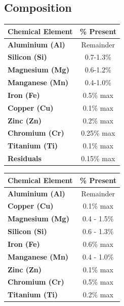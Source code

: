 \documentclass{article}
\begin{document}
\subsection{Composition}
\centering
\begin{minipage}{0.4\textwidth}
    \centering
    \renewcommand{\arraystretch}{1.4}
    \begin{tabular}{|>{\normalsize\bfseries}l|>{\normalsize}c|}
        \hline
        \large\textbf{Chemical Element} & \large\textbf{\% Present} \\ \hline
        Aluminium (Al)            & Remainder           \\ \hline
        Silicon (Si)              & 0.7-1.3\%           \\ \hline
        Magnesium (Mg)            & 0.6-1.2\%           \\ \hline
        Manganese (Mn)            & 0.4-1.0\%           \\ \hline
        Iron (Fe)                 & 0.5\% max           \\ \hline
        Copper (Cu)               & 0.1\% max           \\ \hline
        Zinc (Zn)                 & 0.2\% max           \\ \hline
        Chromium (Cr)             & 0.25\% max          \\ \hline
        Titanium (Ti)             & 0.1\% max           \\ \hline
        Residuals                 & 0.15\% max          \\ \hline
    \end{tabular}
    \label{tab:composition_6082}
    \vspace{1em}
    \begin{tabular}{|>{\normalsize\bfseries}l|>{\normalsize}c|}
        \hline
        \large\textbf{Chemical Element} & \large\textbf{\% Present} \\ \hline
        Aluminium (Al)            & Remainder           \\ \hline
        Copper (Cu)               & 0.1\% max           \\ \hline
        Magnesium (Mg)            & 0.4 - 1.5\%         \\ \hline
        Silicon (Si)              & 0.6 - 1.3\%         \\ \hline
        Iron (Fe)                 & 0.6\% max           \\ \hline
        Manganese (Mn)            & 0.4 - 1.0\%         \\ \hline
        Zinc (Zn)                 & 0.1\% max           \\ \hline
        Chromium (Cr)             & 0.5\% max           \\ \hline
        Titanium (Ti)             & 0.2\% max           \\ \hline
    \end{tabular}
    \label{tab:composition_he30}
\end{minipage}
\end{document}
